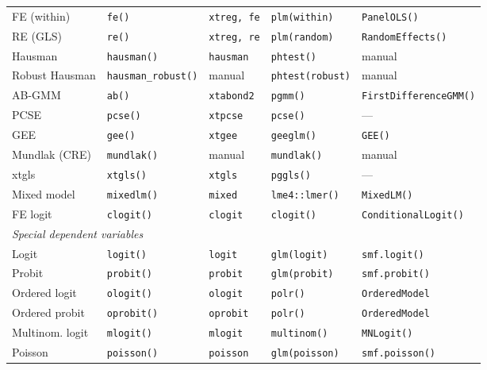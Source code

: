 {\begin{longtable}{lllll}
FE (within)     & \texttt{fe()}         & \texttt{xtreg, fe}    & \texttt{plm(within)}   & \texttt{PanelOLS()} \\
RE (GLS)        & \texttt{re()}         & \texttt{xtreg, re}    & \texttt{plm(random)}   & \texttt{RandomEffects()} \\
Hausman         & \texttt{hausman()}    & \texttt{hausman}      & \texttt{phtest()}      & manual \\
Robust Hausman  & \texttt{hausman\_robust()} & manual           & \texttt{phtest(robust)} & manual \\
AB-GMM          & \texttt{ab()}         & \texttt{xtabond2}     & \texttt{pgmm()}        & \texttt{FirstDifferenceGMM()} \\
PCSE            & \texttt{pcse()}       & \texttt{xtpcse}       & \texttt{pcse()}        & — \\
GEE             & \texttt{gee()}        & \texttt{xtgee}        & \texttt{geeglm()}      & \texttt{GEE()} \\
Mundlak (CRE)   & \texttt{mundlak()}    & manual                & \texttt{mundlak()}     & manual \\
xtgls           & \texttt{xtgls()}      & \texttt{xtgls}        & \texttt{pggls()}       & — \\
Mixed model     & \texttt{mixedlm()}    & \texttt{mixed}        & \texttt{lme4::lmer()}  & \texttt{MixedLM()} \\
FE logit        & \texttt{clogit()}     & \texttt{clogit}       & \texttt{clogit()}      & \texttt{ConditionalLogit()} \\
\midrule
\multicolumn{5}{l}{\textit{Special dependent variables}} \\
Logit           & \texttt{logit()}      & \texttt{logit}        & \texttt{glm(logit)}    & \texttt{smf.logit()} \\
Probit          & \texttt{probit()}     & \texttt{probit}       & \texttt{glm(probit)}   & \texttt{smf.probit()} \\
Ordered logit   & \texttt{ologit()}     & \texttt{ologit}       & \texttt{polr()}        & \texttt{OrderedModel} \\
Ordered probit  & \texttt{oprobit()}    & \texttt{oprobit}      & \texttt{polr()}        & \texttt{OrderedModel} \\
Multinom. logit & \texttt{mlogit()}     & \texttt{mlogit}       & \texttt{multinom()}    & \texttt{MNLogit()} \\
Poisson         & \texttt{poisson()}    & \texttt{poisson}      & \texttt{glm(poisson)}  & \texttt{smf.poisson()} \\

\end{longtable}}
